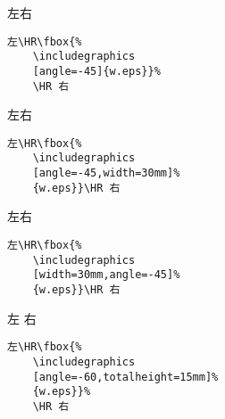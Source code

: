 \begin{minipage}[c]{.45\textwidth}
	左\HR\fbox{%
		\texttt{[image: w]}}\HR 右
\end{minipage}%
\hspace{-.5cm}\begin{minipage}[c]{.5\textwidth}
	\begin{Verbatim}[frame=lines,label=\colorbox{green}{\small 例五},labelposition=topline]
	左\HR\fbox{%
	\includegraphics
	[angle=-45]{w.eps}}%
	\HR 右
	\end{Verbatim}
\end{minipage}

\begin{minipage}[c]{.45\textwidth}
	左\HR{}\HR 右
\end{minipage}%
\hspace{-.5cm}\begin{minipage}[c]{.5\textwidth}
	\begin{Verbatim}[frame=lines,label=\colorbox{green}{\small 例六},labelposition=topline]
	左\HR\fbox{%
	\includegraphics
	[angle=-45,width=30mm]%
	{w.eps}}\HR 右
	\end{Verbatim}
\end{minipage}

\hspace{-1cm}\begin{minipage}[c]{.45\textwidth}
	左\HR{}\HR 右
\end{minipage}%
\begin{minipage}[c]{.5\textwidth}
	\begin{Verbatim}[frame=lines,label=\colorbox{green}{\small 例七},labelposition=topline]
	左\HR\fbox{%
	\includegraphics
	[width=30mm,angle=-45]%
	{w.eps}}\HR 右
	\end{Verbatim}
\end{minipage}

\begin{minipage}[c]{.45\textwidth}
	左\HR\fbox{%
		\texttt{[image: w]}}%
	\HR 右
\end{minipage}%
\hspace{-.5cm}\begin{minipage}[c]{.5\textwidth}
	\begin{Verbatim}[frame=lines,label=\colorbox{green}{\small 例八},labelposition=topline]
	左\HR\fbox{%
	\includegraphics
	[angle=-60,totalheight=15mm]%
	{w.eps}}%
	\HR 右
	\end{Verbatim}
\end{minipage}

